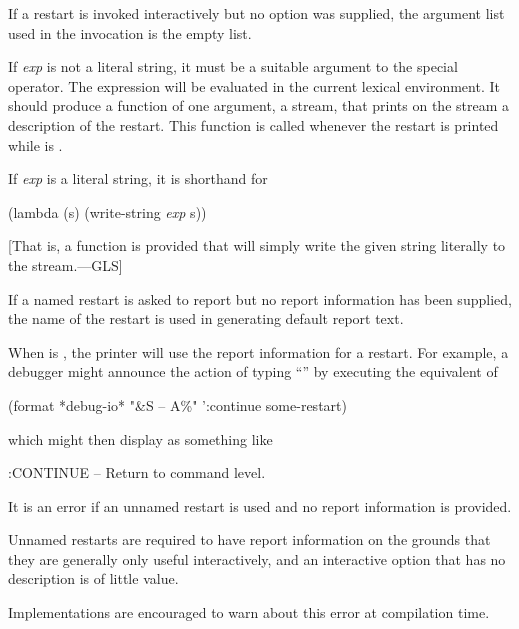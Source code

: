 \begin{defmac}
\begin{flushdesc}
    If a restart is invoked interactively but no  option
    was supplied, the argument list used in the invocation is the empty
    list.

\item[\cd{:report \emph{exp}}]

    If \emph{exp} is not a literal string, it must be a suitable argument to the
     special operator. The expression  will be evaluated
    in the current lexical environment. It should produce a function of one
    argument, a stream, that prints on the stream a description of the
    restart. This function is called whenever the restart is printed while
     is .

    If \emph{exp} is a literal string, it is shorthand for
\begin{lisp}
(lambda (s) (write-string \emph{exp} s))
\end{lisp}
[That is, a function is provided that will simply write the given string literally
to the stream.---GLS]

    If a named restart is asked to report but no report information has been
    supplied, the name of the restart is used in generating default report text.

    When  is , the printer will use the report information for
    a restart. For example, a debugger might announce the action of typing
    ``'' by executing the equivalent of
\begin{lisp}
(format *debug-io* "{\Xtilde}\&{\Xtilde}S -- {\Xtilde}A{\Xtilde}\%" ':continue some-restart)
\end{lisp}
    which might then display as something like
\begin{lisp}
:CONTINUE -- Return to command level.
\end{lisp}

    It is an error if an unnamed restart is used and no report information
    is provided.

\beforenoterule
    \begin{rationale}
    Unnamed restarts are required to have report information
    on the grounds that they are generally only useful interactively,
    and an interactive option that has no description is of little value.
    \end{rationale}
\betweennoterule
\begin{implementation}
      Implementations are encouraged to warn about this error at compilation time.


\end{implementation}
\end{flushdesc}
\end{defmac}
